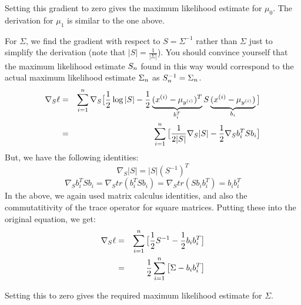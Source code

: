 \begin{answer}
Setting this gradient to zero gives the maximum likelihood estimate
for $\mu_{0}$. The derivation for $\mu_1$ is similar to the one above.

For $\Sigma$, we find the gradient with respect to $S = \Sigma^{-1}$
rather than $\Sigma$ just to simplify the derivation (note that
$|S| = \frac{1}{|\Sigma|}$).
You should
convince yourself that the maximum likelihood estimate $S_{n}$ found in this
way would correspond to the actual maximum likelihood estimate
$\Sigma_{n}$ as $S_{n}^{-1} = \Sigma_{n}$.
\begin{eqnarray*}
  \nabla_S\ell &=& \sum_{i=1}^{{n}} \nabla_S
  \big[ \frac{1}{2}\log|S| -
    \frac{1}{2}\underbrace{(x^{(i)}-\mu_{y^{(i)}})^T}_{b_i^T} S \underbrace{(x^{(i)}-\mu_{y^{(i)}})}_{b_i}
    \big]\\
  &=& \sum_{i=1}^{{n}} \big[
    \frac{1}{2 |S|} \nabla_S |S| - \frac{1}{2} \nabla_S b_i^T S b_i
    \big]\\
\end{eqnarray*}
But, we have the following identities:
\begin{equation*}
\nabla_S |S| = |S| (S^{-1})^T
\end{equation*}
\begin{equation*}
  \nabla_S b_i^T S b_i = \nabla_S tr \left( b_i^T S b_i \right) =
  \nabla_S tr \left( S b_i b_i^T \right) = b_i b_i^T
\end{equation*}
In the above, we again used matrix calculus identities, and also the
commutatitivity of the trace operator for square matrices. Putting
these into the original equation, we get:
\begin{eqnarray*}
  \nabla_S\ell &=& \sum_{i=1}^{{n}} \big[
    \frac{1}{2} S^{-1} - \frac{1}{2} b_i b_i^T
    \big]\\
  &=& \frac{1}{2} \sum_{i=1}^{{n}} \big[
    \Sigma - b_i b_i^T
    \big]
\end{eqnarray*}

Setting this to zero gives the required maximum likelihood estimate
for $\Sigma$.

\end{answer}
